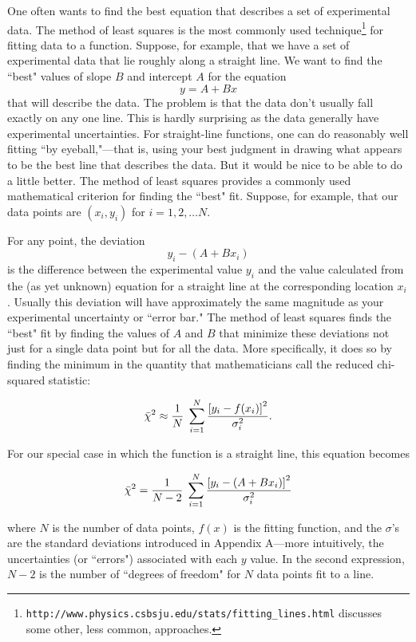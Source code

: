 One often wants to find the best equation that describes a set of
experimental data.  The method of least squares 
is the most commonly used technique\footnote{
{\tt http://www.physics.csbsju.edu/stats/fitting\_lines.html}
discusses some other, less common, approaches.
} for  fitting data to a function.  Suppose, for example, that we
have a set of experimental data that lie roughly along a straight
line.  We want to find the ``best" values of slope $B$ and intercept
$A$
for the equation
\[
y = A + Bx
\]
that will describe the data.  The problem is that the
data don't usually fall exactly on any one line.  This is hardly surprising as
the data generally have experimental uncertainties.
For straight-line functions, one can do
reasonably well fitting ``by
eyeball,"---that is, using your best judgment in drawing what appears to
be the best line that describes the data.  But it would be nice
to be able to do a little better.  The method of least squares
provides
a commonly used mathematical criterion for finding the ``best" fit.
Suppose, for example, that our data points are 
$(x_i, y_i)$ for $i=1,2,\ldots N$.

For any point, the deviation
\[
y_i -(A + Bx_i)
\]
is the difference between the
experimental value $y_i$ and the value calculated from the 
(as yet unknown) equation for a
straight line at the corresponding location $x_i$.  Usually this deviation
will have approximately the same magnitude as your experimental
uncertainty or ``error bar." The method of least squares finds the
``best" fit by finding the values of $A$ and $B$ that minimize these
deviations not just for a single data point but for all the
data.  More specifically, it does so by finding the minimum in the
quantity that mathematicians call the reduced chi-squared statistic:


\begin{equation}
\bar{\chi}^{2} \approx {{1} \over {N}} \; \sum_{i=1}^N {{\left[y_{i} -
         f(x_{i})\right]^{2}} \over {\sigma_{i}^{2}}} .
         \label{eq:chisq}
\end{equation}

For our special case in which the function is a straight line, this
equation becomes

\begin{equation}
\bar{\chi}^{2}= {{1} \over {N-2}} \; \sum_{i=1}^N {{\left[y_{i} -
         (A + Bx_{i})\right]^{2}} \over {\sigma_{i}^{2}}}
         \label{eq:chisq_line}
\end{equation}

where $N$ is the number of data points, $f(x)$ is the fitting
function,
and the $\sigma$'s are the standard deviations introduced in Appendix
A---more intuitively, the uncertainties (or ``errors") associated
with
each $y$ value.  In the second expression, $N-2$ is the 
number of ``degrees of freedom" for $N$ data points fit to a line.

